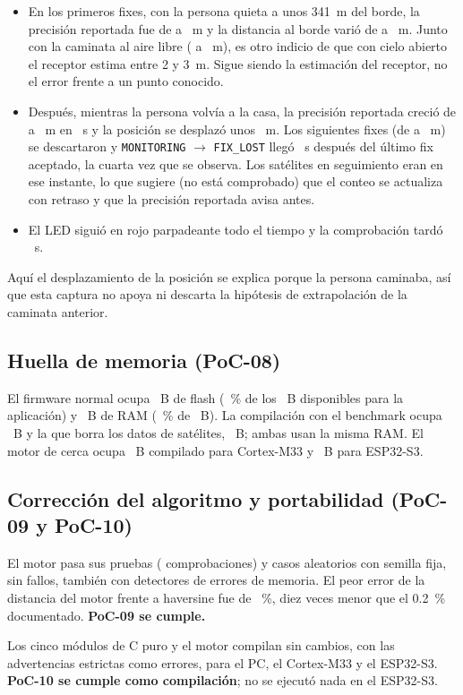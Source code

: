 \begin{itemize}
  \item En los primeros \dTailStillFixes{} fixes, con la persona quieta a unos 341~m del borde, la precisión reportada
        fue de \dTailStillAccLow{} a \dTailStillAccHigh~m y la distancia al borde varió de \dTailStillDistLow{} a
        \dTailStillDistHigh~m. Junto con la caminata al aire libre (\dWalkAccMin{} a \dWalkAccMax~m), es otro indicio de
        que con cielo abierto el receptor estima entre 2 y 3~m. Sigue siendo la estimación del receptor, no el
        error frente a un punto conocido.
  \item Después, mientras la persona volvía a la casa, la precisión reportada creció de \dTailStillAccHigh{} a
        \dTailAccTo~m en \dTailDegradeS~s y la posición se desplazó unos \dTailShiftM~m. Los siguientes \dTailIgnored{}
        fixes (de \dTailIgnoredLow{} a \dTailIgnoredHigh~m) se descartaron y \texttt{MONITORING} $\to$ \texttt{FIX\_LOST}
        llegó \dTailLostS~s después del último fix aceptado, la cuarta vez que se observa. Los satélites en
        seguimiento eran \dTailSats{} en ese instante, lo que sugiere (no está comprobado) que el conteo se actualiza con retraso y que la precisión
        reportada avisa antes.
  \item El LED siguió en rojo parpadeante todo el tiempo y la comprobación tardó \dTailCheckUs~\textmu s.
\end{itemize}

Aquí el desplazamiento de la posición se explica porque la persona caminaba, así que esta captura no apoya ni
descarta la hipótesis de extrapolación de la caminata anterior.

\subsection{Huella de memoria (PoC-08)}

El firmware normal ocupa \dFlashBytes~B de flash (\dFlashPercent~\% de los \dFlashRegion~B disponibles para
la aplicación) y \dRamBytes~B de RAM (\dRamPercent~\% de \dRamRegion~B). La compilación con el benchmark ocupa
\dFlashBench~B y la que borra los datos de satélites, \dFlashCold~B; ambas usan la misma RAM. El motor de
cerca ocupa \dEngineBytesCmThree~B compilado para Cortex-M33 y \dEngineBytesEsp~B para ESP32-S3.

\subsection{Corrección del algoritmo y portabilidad (PoC-09 y PoC-10)}

El motor pasa sus \dHostTests{} pruebas (\dHostChecks{} comprobaciones) y \dStressCases{} casos aleatorios con semilla
fija, sin fallos, también con detectores de errores de memoria. El peor error de la distancia del motor
frente a haversine fue de \dStressWorstErrorPct~\%, diez veces menor que el 0.2~\% documentado. \textbf{PoC-09
se cumple.}

Los cinco módulos de C puro y el motor compilan sin cambios, con las advertencias estrictas como errores, para
el PC, el Cortex-M33 y el ESP32-S3. \textbf{PoC-10 se cumple como compilación}; no se ejecutó nada en el
ESP32-S3.
